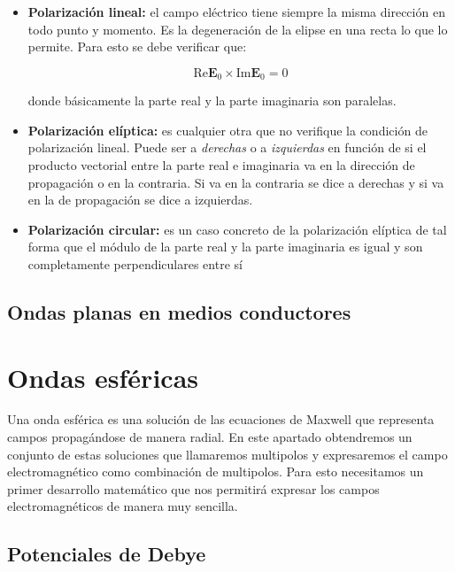 \documentclass[12pt,a4paper]{article}
\newcommand{\Real}{\mathrm{Re}}
\newcommand{\Imaginario}{\mathrm{Im}}
\newcommand{\En}{\mathbf{E}}
\numberwithin{equation}{section}
\numberwithin{figure}{section}
\begin{document}
\begin{itemize}
\item \textbf{Polarización lineal:} el campo eléctrico tiene siempre la misma dirección en todo punto y momento. Es la degeneración de la elipse en una recta lo que lo permite. Para esto se debe verificar que:

\begin{equation}
\Real \En_0 \times \Imaginario \En_0 = 0
\end{equation}

donde básicamente la parte real y la parte imaginaria son paralelas.

\item \textbf{Polarización elíptica:} es cualquier otra que no verifique la condición de polarización lineal. Puede ser a \textit{derechas} o a \textit{izquierdas} en función de si el producto vectorial entre la parte real e imaginaria va en la dirección de propagación o en la contraria. Si va en la contraria se dice a derechas y si va en la de propagación se dice a izquierdas.

\item \textbf{Polarización circular:} es un caso concreto de la polarización elíptica de tal forma que el módulo de la parte real y la parte imaginaria es igual y son completamente perpendiculares entre sí

\end{itemize}

\subsection{Ondas planas en medios conductores}

\newpage

\section{Ondas esféricas \label{Sec:4}}


Una onda esférica es una solución de las ecuaciones de Maxwell que representa campos propagándose de manera radial. En este apartado obtendremos un conjunto de estas soluciones que llamaremos multipolos y expresaremos el campo electromagnético como combinación de multipolos. Para esto necesitamos un primer desarrollo matemático que nos permitirá expresar los campos electromagnéticos de manera muy sencilla.

\subsection{Potenciales de Debye}
\end{document}
